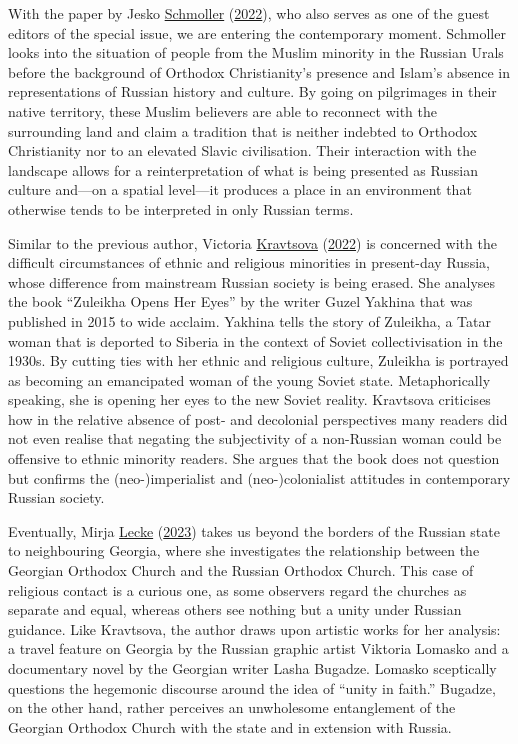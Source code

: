 \documentclass[
  english,
  a4paper,
  DIV=12,
  footlines=2.1,
  usegeometry=true]{scrartcl}
\begin{document}
\leavevmode\marginpar{\textcolor{parnum}{{[}16{]}}}With the paper by
Jesko \protect\hyperlink{ref-schmoller_place_2022}{Schmoller}
(\protect\hyperlink{ref-schmoller_place_2022}{2022}), who also serves as
one of the guest editors of the special issue, we are entering the
contemporary moment. Schmoller looks into the situation of people from
the Muslim minority in the Russian Urals before the background of
Orthodox Christianity's presence and Islam's absence in representations
of Russian history and culture. By going on pilgrimages in their native
territory, these Muslim believers are able to reconnect with the
surrounding land and claim a tradition that is neither indebted to
Orthodox Christianity nor to an elevated Slavic civilisation. Their
interaction with the landscape allows for a reinterpretation of what is
being presented as Russian culture and---on a spatial level---it
produces a place in an environment that otherwise tends to be
interpreted in only Russian terms.

\leavevmode\marginpar{\textcolor{parnum}{{[}17{]}}}Similar to the
previous author, Victoria
\protect\hyperlink{ref-kravtsova_zuleikha_2022}{Kravtsova}
(\protect\hyperlink{ref-kravtsova_zuleikha_2022}{2022}) is concerned
with the difficult circumstances of ethnic and religious minorities in
present-day Russia, whose difference from mainstream Russian society is
being erased. She analyses the book ``Zuleikha Opens Her Eyes'' by the
writer Guzel Yakhina that was published in 2015 to wide acclaim. Yakhina
tells the story of Zuleikha, a Tatar woman that is deported to Siberia
in the context of Soviet collectivisation in the 1930s. By cutting ties
with her ethnic and religious culture, Zuleikha is portrayed as becoming
an emancipated woman of the young Soviet state. Metaphorically speaking,
she is opening her eyes to the new Soviet reality. Kravtsova criticises
how in the relative absence of post- and decolonial perspectives many
readers did not even realise that negating the subjectivity of a
non-Russian woman could be offensive to ethnic minority readers. She
argues that the book does not question but confirms the
(neo-)imperialist and (neo-)colonialist attitudes in contemporary
Russian society.

\leavevmode\marginpar{\textcolor{parnum}{{[}18{]}}}Eventually, Mirja
\protect\hyperlink{ref-lecke_early_2023}{Lecke}
(\protect\hyperlink{ref-lecke_early_2023}{2023}) takes us beyond the
borders of the Russian state to neighbouring Georgia, where she
investigates the relationship between the Georgian Orthodox Church and
the Russian Orthodox Church. This case of religious contact is a curious
one, as some observers regard the churches as separate and equal,
whereas others see nothing but a unity under Russian guidance. Like
Kravtsova, the author draws upon artistic works for her analysis: a
travel feature on Georgia by the Russian graphic artist Viktoria Lomasko
and a documentary novel by the Georgian writer Lasha Bugadze. Lomasko
sceptically questions the hegemonic discourse around the idea of ``unity
in faith.'' Bugadze, on the other hand, rather perceives an unwholesome
entanglement of the Georgian Orthodox Church with the state and in
extension with Russia.
\end{document}
